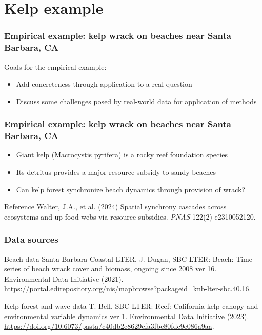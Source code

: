 \documentclass{beamer}
\begin{document}
\section{Kelp example}

\begin{frame}
\frametitle{Empirical example: kelp wrack on beaches near Santa Barbara, CA}
Goals for the empirical example:
\begin{itemize}
\item Add concreteness through application to a real question
\item Discuss some challenges posed by real-world data for application of methods
\end{itemize}
\end{frame}

\begin{frame}
\frametitle{Empirical example: kelp wrack on beaches near Santa Barbara, CA}
\begin{itemize}
\item Giant kelp (Macrocystis pyrifera) is a rocky reef foundation species
\item Its detritus provides a major resource subsidy to sandy beaches
\item Can kelp forest synchronize beach dynamics through provision of wrack?
\end{itemize}
\begin{block}{Reference}
Walter, J.A., et al. (2024) Spatial synchrony cascades across ecosystems and up food webs via resource subsidies. \textit{PNAS} 122(2) e2310052120.
\end{block}
\end{frame}

\begin{frame}
\frametitle{Data sources}
\begin{block}{Beach data}
Santa Barbara Coastal LTER, J. Dugan, SBC LTER: Beach: Time-series of beach wrack cover and biomass, ongoing since 2008 ver 16. Environmental Data Initiative (2021). \url{https://portal.edirepository.org/nis/mapbrowse?packageid=knb-lter-sbc.40.16}.
\end{block}
\begin{block}{Kelp forest and wave data}
T. Bell, SBC LTER: Reef: California kelp canopy and environmental variable dynamics ver 1.
Environmental Data Initiative (2023). \url{https://doi.org/10.6073/pasta/c40db2c8629cfa3fbe80fdc9e086a9aa}.
\end{block}
\end{frame}
\end{document}

